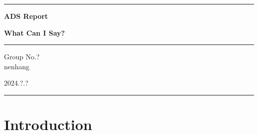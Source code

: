 \documentclass{article}
\begin{document}
\begin{titlepage}
    \centering


    \rule{\textwidth}{0pt}   %
    \vspace{0.25\textheight}  %


    {\Huge \textbf{ADS Report}}

    \vspace{0.025\textheight}   %

    {\fontsize{40}{0}\selectfont \textbf{What Can I Say?}}

    \rule{0.83\textwidth}{0pt}  %

    \vspace{0.02\textheight}  %


    {\Huge Group No.?\\}
    \vspace{0.02\textheight}
    {\Huge nenhang\\}
    \vspace{0.1\textheight}

    {\huge 2024.?.?}  %
    \vspace{0.1\textheight}  %


    \rule{\textwidth}{0pt}  %

  \end{titlepage}

\section{Introduction}
\end{document}
